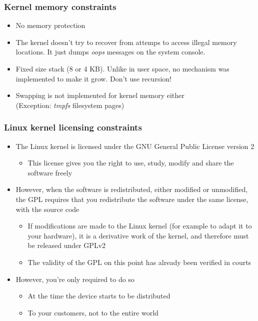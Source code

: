 \begin{frame}
  \frametitle{Kernel memory constraints}
  \begin{itemize}
  \item No memory protection
  \item The kernel doesn't try to recover from attemps to access illegal
    memory locations. It just dumps {\em oops} messages on the system console.
  \item Fixed size stack (8 or 4 KB). Unlike in user space, no mechanism
    was implemented to make it grow. Don't use recursion!
  \item Swapping is not implemented for kernel memory either\\
    (Exception: {\em tmpfs} filesystem pages)
  \end{itemize}
\end{frame}

\begin{frame}
  \frametitle{Linux kernel licensing constraints}
  \begin{itemize}
  \item The Linux kernel is licensed under the GNU General Public
    License version 2
    \begin{itemize}
    \item This license gives you the right to use, study, modify and
      share the software freely
    \end{itemize}
  \item However, when the software is redistributed, either modified
    or unmodified, the GPL requires that you redistribute the software
    under the same license, with the source code
    \begin{itemize}
    \item If modifications are made to the Linux kernel (for example
      to adapt it to your hardware), it is a derivative work of the
      kernel, and therefore must be released under GPLv2
    \item The validity of the GPL on this point has already been
      verified in courts
    \end{itemize}
  \item However, you're only required to do so
    \begin{itemize}
    \item At the time the device starts to be distributed
    \item To your customers, not to the entire world
    \end{itemize}
  \end{itemize}
\end{frame}

